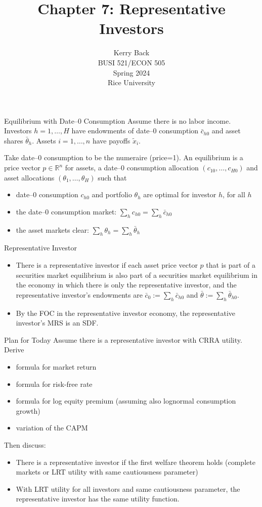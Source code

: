 \documentclass[10pt]{beamer}
\title{Chapter 7: Representative Investors}
\date{}
\author{Kerry Back\\ 
BUSI 521/ECON 505\\
Spring 2024\\
Rice University}
\newcommand{\bi}{\begin{itemize}}
\newcommand{\ei}{\end{itemize}}
\newcommand{\im}{\item}
\newcommand{\myreal}{\ensuremath{\mathbb{R}}}
\newcommand{\tx}{\tilde{x}}
\begin{document}
\maketitle


\begin{frame}{Equilibrium with Date--0 Consumption}
Assume there is no labor income.
Investors $h=1,\ldots,H$ have endowments of date--0 consumption $\bar{c}_{h0}$ and asset shares $\bar{\theta}_h$.  Assets $i=1,\ldots,n$ have payoffs $\tx_i$.

Take date--0 consumption to be the numeraire (price=1).  An equilibrium is a price vector $p\in \myreal^n$ for assets, a date--0 consumption allocation $(c_{10},\ldots,c_{H0})$ and asset allocations $(\theta_1,\ldots,\theta_H)$ such that
\begin{itemize}
    \item date--0 consumption $c_{h0}$ and portfolio $\theta_h$ are optimal for investor $h$, for all $h$
    \item the date--0 consumption market: $\sum_h c_{h0} = \sum_h \bar{c}_{h0}$
    \item the asset markets clear: $\sum_h \theta_h = \sum_h\bar{\theta}_h$
\end{itemize}
\end{frame}

\begin{frame}{Representative Investor}
    \bi 
    \im There is a representative investor 
    if each asset price vector $p$ that is part of a securities market equilibrium is also part of a securities market equilibrium in the economy in which there is only the representative investor, and the representative investor's endowments are $\bar{c}_0 := \sum_h \bar{c}_{h0}$ and $\bar{\theta} := \sum_h \bar{\theta}_{h0}$.  
    
    \im By the FOC in the representative investor economy, the representative investor's MRS is an SDF.
    \ei
 \end{frame}
 
 \begin{frame}{Plan for Today}
     Assume there is a representative investor with CRRA utility.  Derive
     \begin{itemize}
         \item formula for market return 
         \item formula for risk-free rate
         \item formula for log equity premium (assuming also lognormal consumption growth)
         \item variation of the CAPM
     \end{itemize}
     
Then discuss:
\begin{itemize}
    \item There is a representative investor if the first welfare theorem holds (complete markets or LRT utility with same cautiousness parameter)
    \item With LRT utility for all investors and same cautiousness parameter, the representative investor has the same utility function.
\end{itemize}
 \end{frame}
\end{document}
